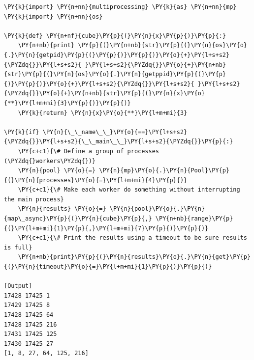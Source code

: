 \begin{Verbatim}[label=\makebox{\url{https://github.com/lucabaldini/cmepda/tree/master/slides/latex/snippets/multiprocessing_map_async_timeout.py}},commandchars=\\\{\}]
\PY{k}{import} \PY{n+nn}{multiprocessing} \PY{k}{as} \PY{n+nn}{mp}
\PY{k}{import} \PY{n+nn}{os}

\PY{k}{def} \PY{n+nf}{cube}\PY{p}{(}\PY{n}{x}\PY{p}{)}\PY{p}{:}
    \PY{n+nb}{print} \PY{p}{(}\PY{n+nb}{str}\PY{p}{(}\PY{n}{os}\PY{o}{.}\PY{n}{getpid}\PY{p}{(}\PY{p}{)}\PY{p}{)}\PY{o}{+}\PY{l+s+s2}{\PYZdq{}}\PY{l+s+s2}{ }\PY{l+s+s2}{\PYZdq{}}\PY{o}{+}\PY{n+nb}{str}\PY{p}{(}\PY{n}{os}\PY{o}{.}\PY{n}{getppid}\PY{p}{(}\PY{p}{)}\PY{p}{)}\PY{o}{+}\PY{l+s+s2}{\PYZdq{}}\PY{l+s+s2}{ }\PY{l+s+s2}{\PYZdq{}}\PY{o}{+}\PY{n+nb}{str}\PY{p}{(}\PY{n}{x}\PY{o}{**}\PY{l+m+mi}{3}\PY{p}{)}\PY{p}{)}
    \PY{k}{return} \PY{n}{x}\PY{o}{**}\PY{l+m+mi}{3}

\PY{k}{if} \PY{n}{\_\_name\_\_}\PY{o}{==}\PY{l+s+s2}{\PYZdq{}}\PY{l+s+s2}{\_\_main\_\_}\PY{l+s+s2}{\PYZdq{}}\PY{p}{:}
    \PY{c+c1}{\# Define a group of processes (\PYZdq{}workers\PYZdq{})}
    \PY{n}{pool} \PY{o}{=} \PY{n}{mp}\PY{o}{.}\PY{n}{Pool}\PY{p}{(}\PY{n}{processes}\PY{o}{=}\PY{l+m+mi}{4}\PY{p}{)}
    \PY{c+c1}{\# Make each worker do something without interrupting the main process}
    \PY{n}{results} \PY{o}{=} \PY{n}{pool}\PY{o}{.}\PY{n}{map\_async}\PY{p}{(}\PY{n}{cube}\PY{p}{,} \PY{n+nb}{range}\PY{p}{(}\PY{l+m+mi}{1}\PY{p}{,}\PY{l+m+mi}{7}\PY{p}{)}\PY{p}{)}
    \PY{c+c1}{\# Print the results using a timeout to be sure results is full}
    \PY{n+nb}{print}\PY{p}{(}\PY{n}{results}\PY{o}{.}\PY{n}{get}\PY{p}{(}\PY{n}{timeout}\PY{o}{=}\PY{l+m+mi}{1}\PY{p}{)}\PY{p}{)}

[Output]
17428 17425 1
17429 17425 8
17428 17425 64
17428 17425 216
17431 17425 125
17430 17425 27
[1, 8, 27, 64, 125, 216]
\end{Verbatim}